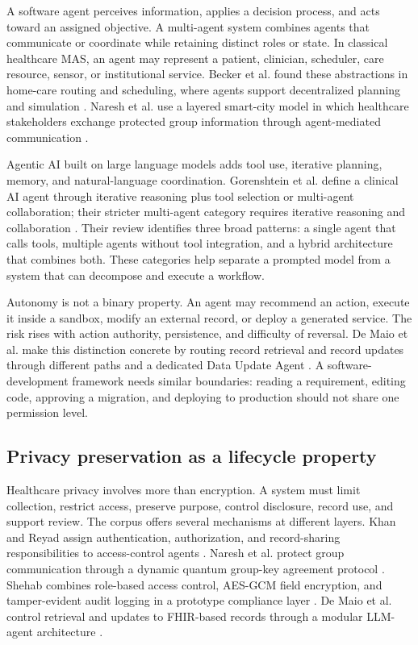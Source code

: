 \documentclass[11pt,a4paper]{article}
\begin{document}
A software agent perceives information, applies a decision process, and acts toward an assigned objective. A multi-agent system combines agents that communicate or coordinate while retaining distinct roles or state. In classical healthcare MAS, an agent may represent a patient, clinician, scheduler, care resource, sensor, or institutional service. Becker et al. found these abstractions in home-care routing and scheduling, where agents support decentralized planning and simulation \cite[pp.~5--10]{becker2018survey}. Naresh et al. use a layered smart-city model in which healthcare stakeholders exchange protected group information through agent-mediated communication \cite[pp.~3--9]{naresh2020quantum}.

Agentic AI built on large language models adds tool use, iterative planning, memory, and natural-language coordination. Gorenshtein et al. define a clinical AI agent through iterative reasoning plus tool selection or multi-agent collaboration; their stricter multi-agent category requires iterative reasoning and collaboration \cite[pp.~23--24]{gorenshtein2025clinical}. Their review identifies three broad patterns: a single agent that calls tools, multiple agents without tool integration, and a hybrid architecture that combines both. These categories help separate a prompted model from a system that can decompose and execute a workflow.

Autonomy is not a binary property. An agent may recommend an action, execute it inside a sandbox, modify an external record, or deploy a generated service. The risk rises with action authority, persistence, and difficulty of reversal. De Maio et al. make this distinction concrete by routing record retrieval and record updates through different paths and a dedicated Data Update Agent \cite[pp.~3--6]{demaio2025privacy}. A software-development framework needs similar boundaries: reading a requirement, editing code, approving a migration, and deploying to production should not share one permission level.

\subsection{Privacy preservation as a lifecycle property}

Healthcare privacy involves more than encryption. A system must limit collection, restrict access, preserve purpose, control disclosure, record use, and support review. The corpus offers several mechanisms at different layers. Khan and Reyad assign authentication, authorization, and record-sharing responsibilities to access-control agents \cite[pp.~2--5]{khan2019ibac}. Naresh et al. protect group communication through a dynamic quantum group-key agreement protocol \cite[pp.~9--20]{naresh2020quantum}. Shehab combines role-based access control, AES-GCM field encryption, and tamper-evident audit logging in a prototype compliance layer \cite[pp.~2--4]{shehab2025agentic}. De Maio et al. control retrieval and updates to FHIR-based records through a modular LLM-agent architecture \cite[pp.~3--8]{demaio2025privacy}.
\end{document}
